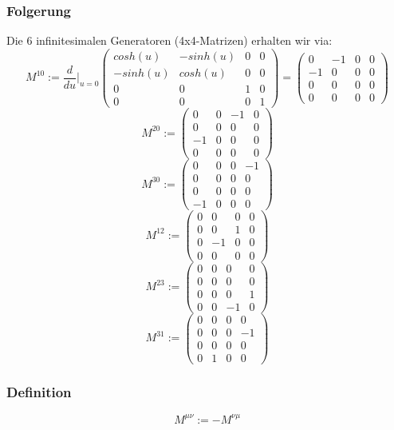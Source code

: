 \documentclass[twoside,a4paper]{scrartcl}
\renewcommand{\1}{\mathds{1}}
\begin{document}
\subsubsection*{Folgerung}
Die 6 infinitesimalen Generatoren (4x4-Matrizen) erhalten wir via:
$$M^{10}:= \frac{d}{du}|_{u=0}\begin{pmatrix}cosh(u) & -sinh(u) & 0& 0 \\ -sinh(u) & cosh(u) & 0& 0 \\ 0 & 0& 1 & 0 \\ 0& 0& 0& 1\end{pmatrix}=\begin{pmatrix}0 & -1& 0& 0 \\ -1 & 0 & 0& 0 \\ 0 & 0& 0 & 0 \\ 0& 0& 0& 0\end{pmatrix}$$
$$M^{20}:=\begin{pmatrix}0 & 0& -1& 0 \\ 0 & 0 & 0& 0 \\ -1 & 0& 0 & 0 \\ 0& 0& 0& 0\end{pmatrix}$$
$$M^{30}:=\begin{pmatrix}0 & 0& 0& -1 \\ 0 & 0 & 0& 0 \\ 0 & 0& 0 & 0 \\ -1& 0& 0& 0\end{pmatrix}$$
$$M^{12}:=\begin{pmatrix}0 & 0& 0& 0 \\ 0 & 0 & 1& 0 \\ 0 & -1& 0 & 0 \\ 0& 0& 0& 0\end{pmatrix}$$
$$M^{23}:=\begin{pmatrix}0 & 0& 0& 0 \\ 0 & 0 & 0& 0 \\ 0 & 0& 0 & 1 \\ 0& 0& -1& 0\end{pmatrix}$$
$$M^{31}:=\begin{pmatrix}0 & 0& 0& 0 \\ 0 & 0 & 0& -1 \\ 0 & 0& 0 & 0 \\ 0& 1& 0& 0\end{pmatrix}$$
\subsubsection*{Definition}
$$M^{\mu\nu}:=-M^{\nu\mu}$$
\end{document}
